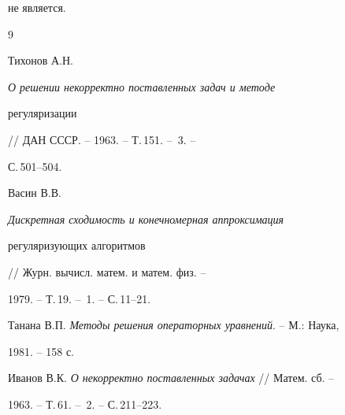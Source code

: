 не является. 


 


 


\begin{thebibliography}{9} 


 




Тихонов А.Н. {\em О решении некорректно поставленных задач и методе 


регуляризации} // ДАН СССР. -- 1963. -- Т.\,151. -- \No\,3. -- 


С.\,501--504. 




Васин В.В. {\em Дискретная сходимость и конечномерная аппроксимация 


регуляризующих алгоритмов} // Журн. вычисл. матем. и матем. физ. -- 


1979. -- Т.\,19. -- \No\,1. -- С.\,11--21. 




Танана В.П. {\em Методы решения операторных уравнений}. -- М.: Наука, 


1981. -- 158 с. 




Иванов В.К. {\em О некорректно поставленных задачах} // Матем. сб. -- 


1963. -- Т.\,61. -- \No\,2. -- С.\,211--223. 


 


\end{thebibliography} 


 


\vskip 2cm 


 






 


\label{end} 


 


